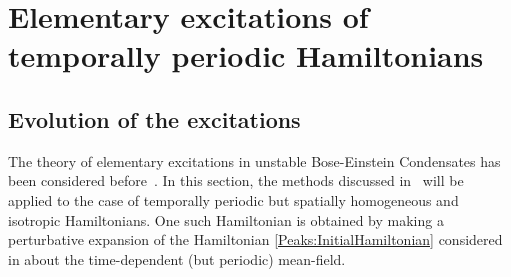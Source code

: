 \chapter{Elementary excitations of temporally periodic Hamiltonians}
\label{FloquetAppendix}
\graphicspath{{Figures/FloquetAppendix/}{Figures/Common/}}

\section{Evolution of the excitations}
\label{FloquetAppendix:Evolution}
The theory of elementary excitations in unstable Bose-Einstein Condensates has been considered before~\citep{Leonhardt:2003}. In this section, the methods discussed in~\citep{Leonhardt:2003} will be applied to the case of temporally periodic but spatially homogeneous and isotropic Hamiltonians. One such Hamiltonian is obtained by making a perturbative expansion of the Hamiltonian \eqref{Peaks:InitialHamiltonian} considered in  about the time-dependent (but periodic) mean-field.


